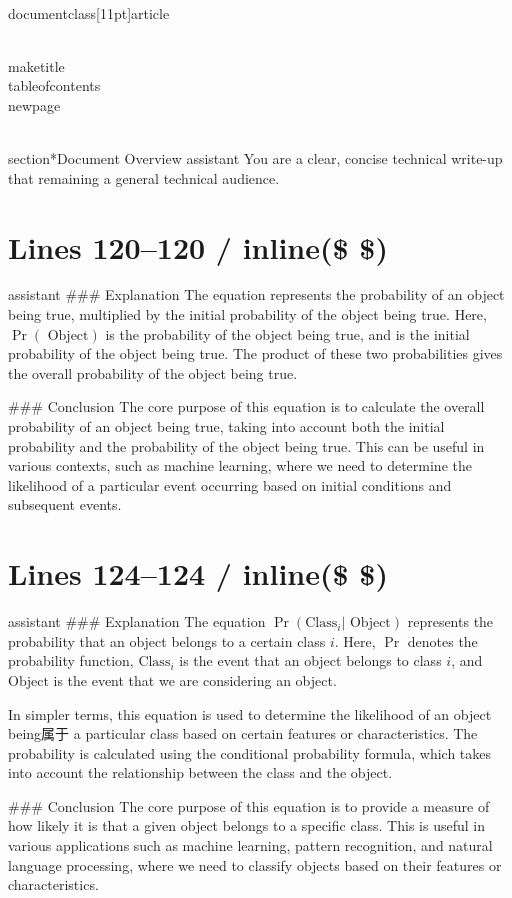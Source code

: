 \\documentclass[11pt]{article}
\begin{document}
\\maketitle
\\tableofcontents
\\newpage

\\section*{Document Overview}
assistant
You are a clear, concise technical write-up that remaining a general technical audience.

\newpage

\section*{Lines 120–120 / inline(\$ \$) }
assistant
### Explanation
The equation  represents the probability of an object being true, multiplied by the initial probability of the object being true. Here, \(\Pr(\textrm{ Object})\) is the probability of the object being true, and  is the initial probability of the object being true. The product of these two probabilities gives the overall probability of the object being true.

### Conclusion
The core purpose of this equation is to calculate the overall probability of an object being true, taking into account both the initial probability and the probability of the object being true. This can be useful in various contexts, such as machine learning, where we need to determine the likelihood of a particular event occurring based on initial conditions and subsequent events.


\section*{Lines 124–124 / inline(\$ \$) }
assistant
### Explanation
The equation \(\Pr(\textrm{Class}_i | \textrm{ Object})\) represents the probability that an object belongs to a certain class \(i\). Here, \(\Pr\) denotes the probability function, \(\textrm{Class}_i\) is the event that an object belongs to class \(i\), and \(\textrm{Object}\) is the event that we are considering an object.

In simpler terms, this equation is used to determine the likelihood of an object being属于 a particular class based on certain features or characteristics. The probability is calculated using the conditional probability formula, which takes into account the relationship between the class and the object.

### Conclusion
The core purpose of this equation is to provide a measure of how likely it is that a given object belongs to a specific class. This is useful in various applications such as machine learning, pattern recognition, and natural language processing, where we need to classify objects based on their features or characteristics.
\end{document}
